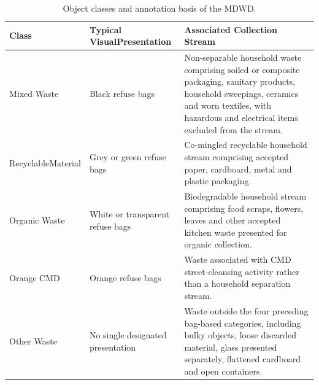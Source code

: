 \begin{table}[H]
\centering
\caption{Object classes and annotation basis of the \gls{MDWD}.}
\label{tab:mdwd-taxonomy}
\begin{tabularx}{\textwidth}{@{}p{2.9cm} p{4.1cm} X@{}}
\toprule
\textbf{Class} & \textbf{Typical Visual\newline Presentation} & \textbf{Associated Collection Stream} \\
\midrule

    Mixed Waste
    & Black refuse bags
    & Non-separable household waste comprising soiled or composite packaging, sanitary products, household sweepings, ceramics and worn textiles, with hazardous and electrical items excluded from the stream. \\

    \addlinespace[0.5em]

    Recyclable\newline Material
    & Grey or green refuse bags
    & Co-mingled recyclable household stream comprising accepted paper, cardboard, metal and plastic packaging. \\

    \addlinespace[0.5em]

    Organic Waste
    & White or transparent refuse bags
    & Biodegradable household stream comprising food scraps, flowers, leaves and other accepted kitchen waste presented for organic collection. \\

    \addlinespace[0.5em]

    Orange \gls{CMD}
    & Orange refuse bags
    & Waste associated with \gls{CMD} street-cleansing activity rather than a household separation stream. \\

    \addlinespace[0.5em]

    Other Waste
    & No single designated presentation
    & Waste outside the four preceding bag-based categories, including bulky objects, loose discarded material, glass presented separately, flattened cardboard and open containers. \\

\bottomrule
\end{tabularx}
\end{table}


